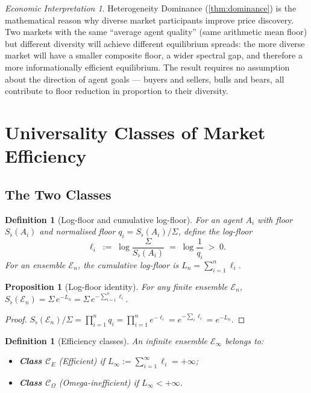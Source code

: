 \documentclass[twocolumn,11pt,a4paper]{article}
\newtheorem{proposition}[theorem]{Proposition}
\newtheorem{definition}[theorem]{Definition}
\theoremstyle{remark}
\newtheorem{econinterp}[theorem]{Economic Interpretation}
\newcommand{\Sflat}{S_{\flat}}
\newcommand{\Ens}{\mathcal{E}}
\newcommand{\ClassE}{\mathcal{C}_E}       %
\newcommand{\ClassO}{\mathcal{C}_\Omega}  %
\newcommand{\logfl}{\ell}                 %
\newcommand{\Logfl}{L}                    %
\begin{document}
\begin{econinterp}
\label{ei:dominance}
Heterogeneity Dominance (\cref{thm:dominance}) is the mathematical reason
why diverse market participants improve price discovery.  Two markets with
the same ``average agent quality'' (same arithmetic mean floor) but different
diversity will achieve different equilibrium spreads: the more diverse market
will have a smaller composite floor, a wider spectral gap, and therefore a
more informationally efficient equilibrium.  The result requires no
assumption about the direction of agent goals — buyers and sellers, bulls
and bears, all contribute to floor reduction in proportion to their diversity.
\end{econinterp}

\section{Universality Classes of Market Efficiency}
\label{sec:classes}

\subsection{The Two Classes}
\label{sec:classes:two}

\begin{definition}[Log-floor and cumulative log-floor]
\label{def:logfloor}
For an agent $A_i$ with floor $\Sflat(A_i)$ and normalised floor
$q_i = \Sflat(A_i)/\Sigma$, define the \emph{log-floor}
\[
  \logfl_i \;:=\; \log\!\frac{\Sigma}{\Sflat(A_i)} \;=\; \log\frac{1}{q_i}
  \;>\; 0.
\]
For an ensemble $\Ens_n$, the \emph{cumulative log-floor} is
$\Logfl_n = \sum_{i=1}^n \logfl_i$.
\end{definition}

\begin{proposition}[Log-floor identity]
\label{prop:logfloor-id}
For any finite ensemble $\Ens_n$,
$\Sflat(\Ens_n) = \Sigma\, e^{-\Logfl_n} = \Sigma\, e^{-\sum_{i=1}^n \logfl_i}$.
\end{proposition}
\begin{proof}
$\Sflat(\Ens_n)/\Sigma = \prod_{i=1}^n q_i = \prod_{i=1}^n e^{-\logfl_i}
= e^{-\sum_i \logfl_i} = e^{-\Logfl_n}$.
\end{proof}

\begin{definition}[Efficiency classes]
\label{def:classes}
An infinite ensemble $\Ens_\infty$ belongs to:
\begin{itemize}
\item \textbf{Class $\ClassE$} (Efficient) if
  $\Logfl_\infty := \sum_{i=1}^\infty \logfl_i = +\infty$;
\item \textbf{Class $\ClassO$} (Omega-inefficient) if
  $\Logfl_\infty < +\infty$.
\end{itemize}
\end{definition}
\end{document}
